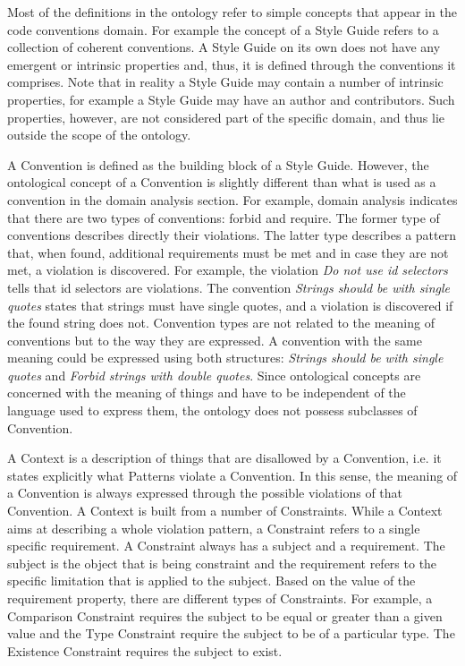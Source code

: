 Most of the definitions in the ontology refer to simple concepts that appear in the code conventions
domain. For example the concept of a Style Guide refers to a collection of coherent conventions. A
Style Guide on its own does not have any emergent or intrinsic properties and, thus, it is defined
through the conventions it comprises. Note that in reality a Style Guide may contain a number of
intrinsic properties, for example a Style Guide may have an author and contributors. Such
properties, however, are not considered part of the specific domain, and thus lie outside the scope
of the ontology.

A Convention is defined as the building block of a Style Guide. However, the ontological concept of
a Convention is slightly different than what is used as a convention in the domain analysis section.
For example, domain analysis indicates that there are two types of conventions: forbid and require.
The former type of conventions describes directly their violations. The latter type describes a
pattern that, when found, additional requirements must be met and in case they are not met, a
violation is discovered. For example, the violation \textit{Do not use id selectors} tells that id
selectors are violations. The convention \textit{Strings should be with single quotes} states that
strings must have single quotes, and a violation is discovered if the found string does not.
Convention types are not related to the meaning of conventions but to the way they are expressed. A
convention with the same meaning could be expressed using both structures: \textit{Strings should be
with single quotes} and \textit{Forbid strings with double quotes}. Since ontological concepts are
concerned with the meaning of things and have to be independent of the language used to express
them, the ontology does not possess subclasses of Convention.

A Context is a description of things that are disallowed by a Convention, i.e. it states explicitly
what Patterns violate a Convention. In this sense, the meaning of a Convention is always expressed
through the possible violations of that Convention. A Context is built from a number of Constraints.
While a Context aims at describing a whole violation pattern, a Constraint refers to a single
specific requirement. A Constraint always has a subject and a requirement. The subject is the object
that is being constraint and the requirement refers to the specific limitation that is applied to
the subject. Based on the value of the requirement property, there are different types of
Constraints. For example, a Comparison Constraint requires the subject to be equal or greater than a
given value and the Type Constraint require the subject to be of a particular type. The Existence
Constraint requires the subject to exist.

